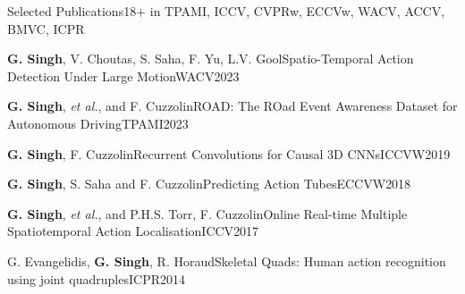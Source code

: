 \documentclass{resume} %
\begin{document}
\vspace{0.1in}
\begin{rSection}{Selected Publications}{18+\footnotesize{ in TPAMI, ICCV, CVPRw, ECCVw, WACV, ACCV, BMVC, ICPR}}
  \begin{pSubsection}{\textbf{G. Singh}, V. Choutas, S. Saha, F. Yu, L.V. Gool}{Spatio-Temporal Action Detection Under Large Motion}{WACV}{2023}\end{pSubsection}
  \begin{pSubsection}{\textbf{G. Singh}, \textit{et al.}, and
    F. Cuzzolin}{ROAD: The ROad Event Awareness Dataset for Autonomous Driving}{TPAMI}{2023}\end{pSubsection}
  \begin{pSubsection}{\textbf{G. Singh}, F. Cuzzolin}{Recurrent Convolutions for Causal 3D CNNs}{ICCVW}{2019}\end{pSubsection}
  \begin{pSubsection}{\textbf{G. Singh}, S. Saha and F. Cuzzolin}{Predicting Action Tubes}{ECCVW}{2018}\end{pSubsection}
  \begin{pSubsection}{\textbf{G. Singh}, \textit{et al.}, and P.H.S. Torr, F. Cuzzolin}{Online Real-time Multiple Spatiotemporal Action Localisation}{ICCV}{2017}\end{pSubsection}
  \begin{pSubsection}{G. Evangelidis, \textbf{G. Singh}, R. Horaud}{Skeletal Quads: Human action recognition using joint quadruples}{ICPR}{2014}\end{pSubsection}
  
  \end{rSection}
\end{document}
